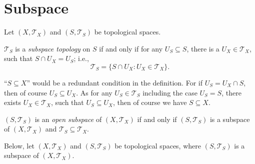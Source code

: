 \section{Subspace}


Let $(X, \mathcal T_X)$ and $(S, \mathcal T_S)$ be topological spaces.


\begin{definition}
	$\mathcal T_S$ is a \textit{subspace topology} on $S$ if and only if for any $U_S \subseteq S$, there is a $U_X \in \mathcal T_X$, such that $S \cap U_X = U_S$; i.e.,
	$$
	\mathcal T_S = \{ S \cap U_X : U_X \in \mathcal T_X \}. %
	$$
\end{definition}


\begin{note}
	``$S \subseteq X$'' would be a redundant condition in the definition. For if $U_S = U_X \cap S$, then of course $U_S \subseteq U_X$. As for any $U_S \in \mathcal T_S$ including the case $U_S = S$, there exists $U_X \in \mathcal T_X$, such that $U_S \subseteq U_X$, then of course we have $S \subseteq X$.
\end{note}


\begin{definition}
	$(S, \mathcal T_S)$ is an \textit{open subspace} of $(X, \mathcal T_X)$ if and only if $(S, \mathcal T_S)$ is a subspace of $(X, \mathcal T_X)$ and $\mathcal T_S \subseteq \mathcal T_X$.
\end{definition}


Below, let $(X, \mathcal T_X)$ and $(S, \mathcal T_S)$ be topological spaces, where $(S, \mathcal T_S)$ is a subspace of $(X, \mathcal T_X)$.


